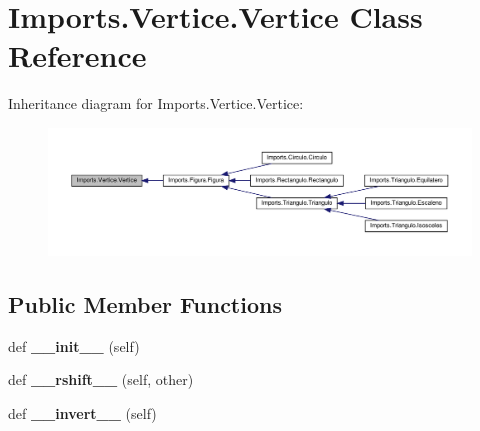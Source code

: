 \hypertarget{class_imports_1_1_vertice_1_1_vertice}{}\section{Imports.\+Vertice.\+Vertice Class Reference}
\label{class_imports_1_1_vertice_1_1_vertice}


Inheritance diagram for Imports.\+Vertice.\+Vertice\+:
\nopagebreak
\begin{figure}[H]
\begin{center}
\leavevmode
\includegraphics[width=350pt]{class_imports_1_1_vertice_1_1_vertice__inherit__graph}
\end{center}
\end{figure}
\subsection*{Public Member Functions}
\begin{DoxyCompactItemize}
\item 
\mbox{\label{class_imports_1_1_vertice_1_1_vertice_a8b8a76f8adcbf78de00db07756c8d976}} 
def {\bfseries \+\_\+\+\_\+init\+\_\+\+\_\+} (self)
\item 
\mbox{\label{class_imports_1_1_vertice_1_1_vertice_af62a2375ac42f08969130c96d3466edf}} 
def {\bfseries \+\_\+\+\_\+rshift\+\_\+\+\_\+} (self, other)
\item 
\mbox{\label{class_imports_1_1_vertice_1_1_vertice_a8ddbbc9c3b7b9a6454ed39d30e7e19c9}} 
def {\bfseries \+\_\+\+\_\+invert\+\_\+\+\_\+} (self)
\end{DoxyCompactItemize}
